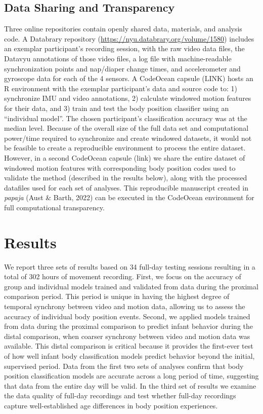 \documentclass[
  man]{apa6}
\begin{document}
\hypertarget{data-sharing-and-transparency}{%
\subsection{Data Sharing and Transparency}\label{data-sharing-and-transparency}}

Three online repositories contain openly shared data, materials, and analysis code. A Databrary repository (\url{https://nyu.databrary.org/volume/1580}) includes an exemplar participant's recording session, with the raw video data files, the Datavyu annotations of those video files, a log file with machine-readable synchronization points and nap/diaper change times, and accelerometer and gyroscope data for each of the 4 sensors. A CodeOcean capsule (LINK) hosts an R environment with the exemplar participant's data and source code to: 1) synchronize IMU and video annotations, 2) calculate windowed motion features for their data, and 3) train and test the body position classifier using an ``individual model''. The chosen participant's classification accuracy was at the median level. Because of the overall size of the full data set and computational power/time required to synchronize and create windowed datasets, it would not be feasible to create a reproducible environment to process the entire dataset. However, in a second CodeOcean capsule (link) we share the entire dataset of windowed motion features with corresponding body position codes used to validate the method (described in the results below), along with the processed datafiles used for each set of analyses. This reproducible manuscript created in \emph{papaja} (Aust \& Barth, 2022) can be executed in the CodeOcean environment for full computational transparency.

\hypertarget{results}{%
\section{Results}\label{results}}

We report three sets of results based on 34 full-day testing sessions resulting in a total of 302 hours of movement recording. First, we focus on the accuracy of group and individual models trained and validated from data during the proximal comparison period. This period is unique in having the highest degree of temporal synchrony between video and motion data, allowing us to assess the accuracy of individual body position events. Second, we applied models trained from data during the proximal comparison to predict infant behavior during the distal comparison, when coarser synchrony between video and motion data was available. This distal comparison is critical because it provides the first-ever test of how well infant body classification models predict behavior beyond the initial, supervised period. Data from the first two sets of analyses confirm that body position classification models are accurate across a long period of time, suggesting that data from the entire day will be valid. In the third set of results we examine the data quality of full-day recordings and test whether full-day recordings capture well-established age differences in body position experiences.
\end{document}
